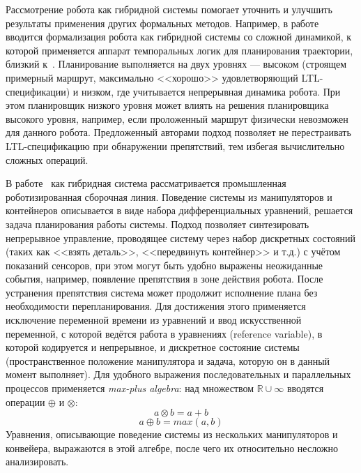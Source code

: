 \documentclass[a4, 14pt]{article}
\begin{document}
Рассмотрение робота как гибридной системы помогает уточнить и улучшить результаты
применения других формальных методов. Например, в работе~\cite{maly2013hybrid} вводится
формализация робота как гибридной системы со сложной динамикой, к которой применяется аппарат
темпоральных логик для планирования траектории, близкий к~\cite{kress2007s}. Планирование 
выполняется на двух уровнях --- высоком (строящем примерный маршрут, максимально <<хорошо>> 
удовлетворяющий LTL-спецификации) и низком, где учитывается непрерывная динамика робота.
При этом планировщик низкого уровня может влиять на решения планировщика высокого уровня, 
например, если проложенный маршрут физически невозможен для данного робота.
Предложенный авторами подход позволяет не перестраивать LTL-спецификацию при обнаружении
препятствий, тем избегая вычислительно сложных операций.

В работе~\cite{song2000planning} как гибридная система рассматривается промышленная роботизированная
сборочная линия. Поведение системы из манипуляторов и контейнеров описывается в виде
набора дифференциальных уравнений, решается задача планирования работы системы. 
Подход позволяет синтезировать непрерывное управление, проводящее систему
через набор дискретных состояний (таких как <<взять деталь>>, <<передвинуть контейнер>> и т.д.)
с учётом показаний сенсоров, при этом могут быть удобно выражены неожиданные события, например, появление препятствия
в зоне действия робота. После устранения препятствия система может продолжит исполнение плана
без необходимости перепланирования. Для достижения этого применяется исключение переменной
времени из уравнений и ввод искусственной переменной, с которой ведётся работа в уравнениях
(reference variable), в которой кодируется и непрерывное, и дискретное состояние системы 
(пространственное положение манипулятора и задача, которую он в данный момент выполняет).
Для удобного выражения последовательных и параллельных процессов применяется \textit{max-plus algebra}:
над множеством $\mathbb{R} \cup \infty$ вводятся операции $\oplus$ и $\otimes$:
$$a \otimes b = a + b$$
$$a \oplus b = max(a, b)$$
Уравнения, описывающие поведение системы из нескольких манипуляторов и конвейера,
выражаются в этой алгебре, после чего их относительно несложно анализировать.
\end{document}
